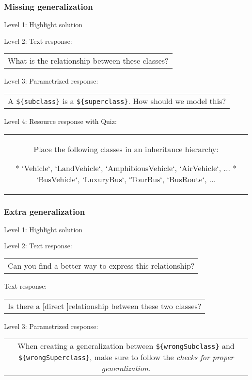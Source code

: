 \subsubsection{Missing generalization}

\noindent Level 1: Highlight solution \medskip

\noindent Level 2: Text response: \medskip

\begin{tabular}{|c}
What is the relationship between these classes?
\end{tabular} \medskip

\noindent Level 3: Parametrized response: \medskip

\begin{tabular}{|c}
A \verb|${subclass}| is a \verb|${superclass}|. How should we model this?
\end{tabular} \medskip

\noindent Level 4: Resource response with Quiz:

\begin{tabular}{|c}
Place the following classes in an inheritance hierarchy:

* `Vehicle`, `LandVehicle`, `AmphibiousVehicle`, `AirVehicle`, ...
* `BusVehicle`, `LuxuryBus`, `TourBus`, `BusRoute`, ...
\end{tabular} \medskip


\subsubsection{Extra generalization}

\noindent Level 1: Highlight solution \medskip

\noindent Level 2: Text response: \medskip

\begin{tabular}{|c}
Can you find a better way to express this relationship?
\end{tabular} \medskip

Text response: \medskip

\begin{tabular}{|c}
Is there a [direct ]relationship between these two classes?
\end{tabular} \medskip

\noindent Level 3: Parametrized response: \medskip

\begin{tabular}{|c}
When creating a generalization between \verb|${wrongSubclass}| and \verb|${wrongSuperclass}|, make sure to follow the \textit{checks for proper generalization}.
\end{tabular} \medskip

